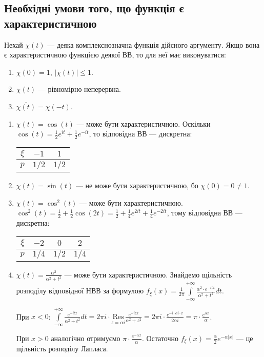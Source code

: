 \subsection{Необхідні умови того, що функція є характеристичною}
Нехай $\chi(t)$ --- деяка комплекснозначна функція дійсного аргументу.
Якщо вона є характеристичною функцією деякої ВВ, то для неї має виконуватися:
\begin{enumerate}
    \item $\chi(0) = 1$, $\left| \chi(t)\right| \leq 1$.
    \item $\chi(t)$ --- рівномірно неперервна.
    \item $\overline{\chi(t)} = \chi(-t)$.
\end{enumerate}
\begin{example}
    \begin{enumerate}
        \item $\chi(t) = \cos(t)$ --- може бути характеристичною.
        Оскільки $\cos(t) = \frac{1}{2}e^{it} + \frac{1}{2}e^{-it}$, то відповідна ВВ --- дискретна: 
        \begin{tabular}{|c|c|c|}
            \hline
            $\xi$ & $-1$ & $1$ \\
            \hline
            $p$ & $1/2$ & $1/2$ \\
            \hline
        \end{tabular}
        \item $\chi(t) = \sin(t)$ --- не може бути характеристичною, бо $\chi(0) = 0 \neq 1$.
        \item $\chi(t) = \cos^2(t)$ --- може бути характеристичною.
        $\cos^2(t) = \frac{1}{2} + \frac{1}{2}\cos(2t) = \frac{1}{2} + \frac{1}{4}e^{2it} + \frac{1}{4}e^{-2it}$, тому
        відповідна ВВ --- дискретна:
        \begin{tabular}{|c|c|c|c|}
            \hline
            $\xi$ & $-2$ & $0$ & $2$ \\
            \hline
            $p$ & $1/4$ & $1/2$ & $1/4$ \\
            \hline
        \end{tabular}
        \item $\chi(t) = \frac{\alpha^2}{\alpha^2 + t^2}$ --- може бути характеристичною. 
        Знайдемо щільність розподілу відповідної НВВ за формулою $f_\xi(x) = \frac{1}{2\pi}\int\limits_{-\infty}^{+\infty} \frac{\alpha^2 \cdot e^{-itx}}{\alpha^2 + t^2} dt$.

        При $x<0$: $\int\limits_{-\infty}^{+\infty} \frac{e^{-itx}}{\alpha^2 + t^2} dt = 2\pi i \cdot \underset{z=\alpha i}{\mathrm{Res}} \frac{e^{-izx}}{\alpha^2 + z^2} = 2\pi i \cdot \frac{e^{-i\cdot \alpha i\cdot x}}{2\alpha i} = \pi \cdot \frac{e^{\alpha x}}{\alpha}$.

        При $x>0$ аналогічно отримуємо $\pi \cdot \frac{e^{-\alpha x}}{\alpha}$.
        Остаточно $f_\xi(x) = \frac{\alpha}{2}e^{-\alpha |x|}$ --- це щільність розподілу Лапласа.
    \end{enumerate}
\end{example}

